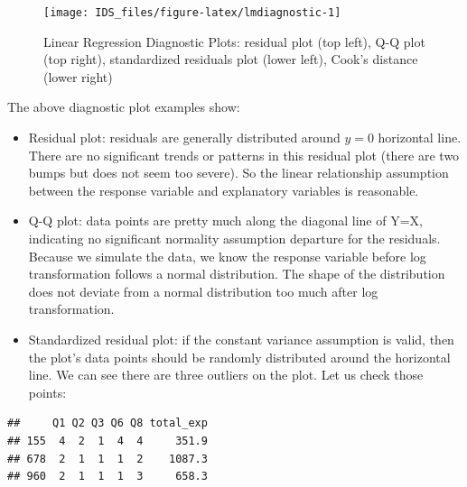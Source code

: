\documentclass[12pt,]{krantz}
\makeatletter
\newenvironment{Shaded}{\begin{snugshade}}{\end{snugshade}}
\newcommand{\DecValTok}[1]{\textcolor[rgb]{0.06,0.06,0.06}{#1}}
\newcommand{\KeywordTok}[1]{\textcolor[rgb]{0.27,0.27,0.27}{\textbf{#1}}}
\newcommand{\NormalTok}[1]{#1}
\newcommand{\OperatorTok}[1]{\textcolor[rgb]{0.43,0.43,0.43}{\textbf{#1}}}
\newcommand{\StringTok}[1]{\textcolor[rgb]{0.5,0.5,0.5}{#1}}
\newenvironment{kframe}{%
\medskip{}
\setlength{\fboxsep}{.8em}
 \def\at@end@of@kframe{}%
 \ifinner\ifhmode%
  \def\at@end@of@kframe{\end{minipage}}%
  \begin{minipage}{\columnwidth}%
 \fi\fi%
 \def\FrameCommand##1{\hskip\@totalleftmargin \hskip-\fboxsep
 \colorbox{shadecolor}{##1}\hskip-\fboxsep
     \hskip-\linewidth \hskip-\@totalleftmargin \hskip\columnwidth}%
 \MakeFramed {\advance\hsize-\width
   \@totalleftmargin\z@ \linewidth\hsize
   \@setminipage}}%
 {\par\unskip\endMakeFramed%
 \at@end@of@kframe}
\renewenvironment{Shaded}{\begin{kframe}}{\end{kframe}}
\makeatother
\begin{document}
\begin{figure}

{\centering \texttt{[image: IDS\_files/figure-latex/lmdiagnostic-1]} 

}

\caption{Linear Regression Diagnostic Plots: residual plot (top left), Q-Q plot (top right), standardized residuals plot (lower left), Cook's distance (lower right)}\label{fig:lmdiagnostic}
\end{figure}

The above diagnostic plot examples show:

\begin{itemize}
\item
  Residual plot: residuals are generally distributed around \(y=0\) horizontal line. There are no significant trends or patterns in this residual plot (there are two bumps but does not seem too severe). So the linear relationship assumption between the response variable and explanatory variables is reasonable.
\item
  Q-Q plot: data points are pretty much along the diagonal line of Y=X, indicating no significant normality assumption departure for the residuals. Because we simulate the data, we know the response variable before log transformation follows a normal distribution. The shape of the distribution does not deviate from a normal distribution too much after log transformation.
\item
  Standardized residual plot: if the constant variance assumption is valid, then the plot's data points should be randomly distributed around the horizontal line. We can see there are three outliers on the plot. Let us check those points:
\end{itemize}

\begin{Shaded}
\end{Shaded}

\begin{verbatim}
##     Q1 Q2 Q3 Q6 Q8 total_exp
## 155  4  2  1  4  4     351.9
## 678  2  1  1  1  2    1087.3
## 960  2  1  1  1  3     658.3
\end{verbatim}
\end{document}
